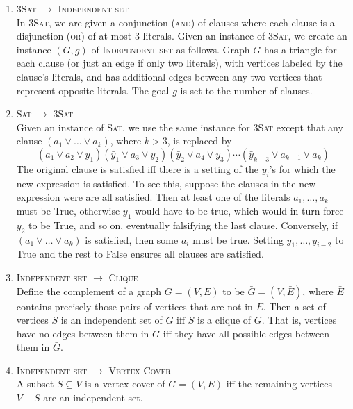 \documentclass[10pt]{article}
\begin{document}
\begin{multicols}{2}
\begin{addmargin}[0.8em]{0.5em}
\begin{enumerate}[label=(\alph*)]
        \item \textsc{3Sat} $\rightarrow$ \textsc{Independent set} \\
        In \textsc{3Sat}, we are given a conjunction (\textsc{and}) of clauses where each clause is a disjunction (\textsc{or}) of at most 3 literals. Given an instance of \textsc{3Sat}, we create an instance $(G, g)$ of \textsc{Independent set} as follows. Graph $G$ has a triangle for each clause (or just an edge if only two literals), with vertices labeled by the clause’s literals, and has additional edges between any two vertices that represent opposite literals. The goal $g$ is set to the number of clauses.
        
        \item \textsc{Sat} $\rightarrow$ \textsc{3Sat} \\
        Given an instance of \textsc{Sat}, we use the same instance for \textsc{3Sat} except that any clause $(a_1 \lor \hdots \lor a_k)$, where $k > 3$, is replaced by
        $$
        (a_1 \lor a_2 \lor y_1)(\bar{y}_1 \lor a_3 \lor y_2)(\bar{y}_2 \lor a_4 \lor y_3) \cdots (\bar{y}_{k-3} \lor a_{k-1} \lor a_k)
        $$
        The original clause is satisfied iff there is a setting of the $y_i$'s for which the new expression is satisfied. To see this, suppose the clauses in the new expression were are all satisfied. Then at least one of the literals $a_1, \hdots, a_k$ must be True, otherwise $y_1$ would have to be true, which would in turn force $y_2$ to be True, and so on, eventually falsifying the last clause. Conversely, if $(a_1 \lor \hdots \lor a_k)$ is satisfied, then some $a_i$ must be true. Setting $y_1, \hdots, y_{i-2}$ to True and the rest to False ensures all clauses are satisfied.
        
        \item \textsc{Independent set} $\rightarrow$ \textsc{Clique} \\
        Define the complement of a graph $G=(V,E)$ to be $\bar{G}=(V,\bar{E})$, where $\bar{E}$ contains precisely those pairs of vertices that are not in $E$. Then a set of vertices $S$ is an independent set of $G$ iff $S$ is a clique of $\bar{G}$. That is, vertices have no edges between them in $G$ iff they have all possible edges between them in $\bar{G}$.
        
        \item \textsc{Independent set} $\rightarrow$ \textsc{Vertex Cover} \\
        A subset $S \subseteq V$ is a vertex cover of $G=(V,E)$ iff the remaining vertices $V - S$ are an independent set.         
        

\end{enumerate}
\end{addmargin}
\end{multicols}
\end{document}

